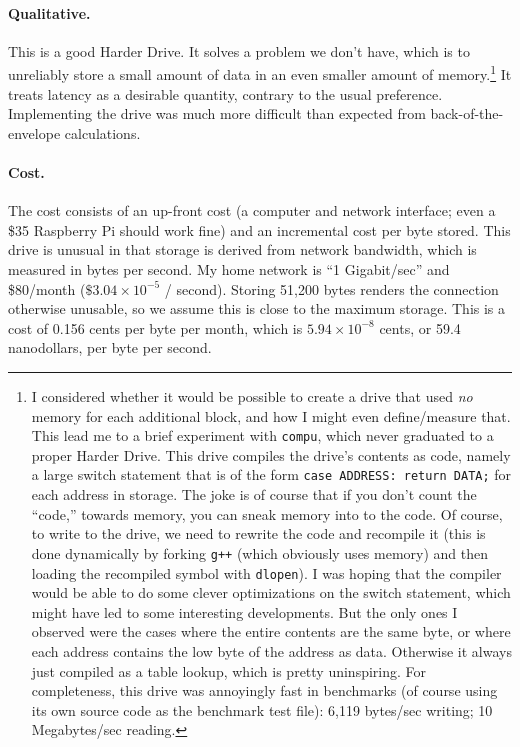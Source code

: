 \documentclass[twocolumn]{article}
\begin{document}
\paragraph{Qualitative.} This is a good Harder Drive. It solves
a problem we don't have, which is to unreliably store a small amount
of data in an even smaller amount of memory.\!\footnote{
  I considered whether it would be possible to create a drive
  that used {\em no} memory for each additional block, and how
  I might even define/measure that. This lead me to a brief experiment
  with {\tt compu}, which never graduated to a proper Harder Drive.
  This drive compiles the drive's contents as code, namely a
  large switch statement that is of the form \verb+case ADDRESS: return DATA;+
  for each address in storage. The joke is of course that if you
  don't count the ``code,'' towards memory, you can sneak memory
  into to the code. Of course, to write to the drive, we need to
  rewrite the code and recompile it (this is done dynamically by
  forking \verb|g++| (which obviously uses memory) and then
  loading the recompiled symbol with \verb|dlopen|). I was
  hoping that the compiler would be able to do some clever
  optimizations on the switch statement, which might have led
  to some interesting developments. But the only ones I observed
  were the cases where the entire contents are the same byte,
  or where each address contains the low byte of the address
  as data. Otherwise it always just compiled as a table lookup,
  which is pretty uninspiring. For completeness, this drive
  was annoyingly fast in benchmarks (of course using its own
  source code as the benchmark test file): 6,119 bytes/sec
  writing; 10 Megabytes/sec reading.
  } It treats latency as a
desirable quantity, contrary to the usual preference. Implementing the
drive was much more difficult than expected from back-of-the-envelope
calculations.

\paragraph{Cost.} The cost consists of an up-front cost (a computer
and network interface; even a \$35 Raspberry Pi should work fine) and
an incremental cost per byte stored. This drive is unusual in that
storage is derived from network bandwidth, which is measured in bytes
per second. My home network is ``1 Gigabit/sec'' and \$80/month
($\$3.04 \times 10^{-5}$ / second). Storing 51,200 bytes renders the
connection otherwise unusable, so we assume this is close to the
maximum storage. This is a cost of 0.156 cents per byte per month,
which is $5.94 \times 10^{-8}$ cents, or 59.4 nanodollars, per byte
per second.
\end{document}
